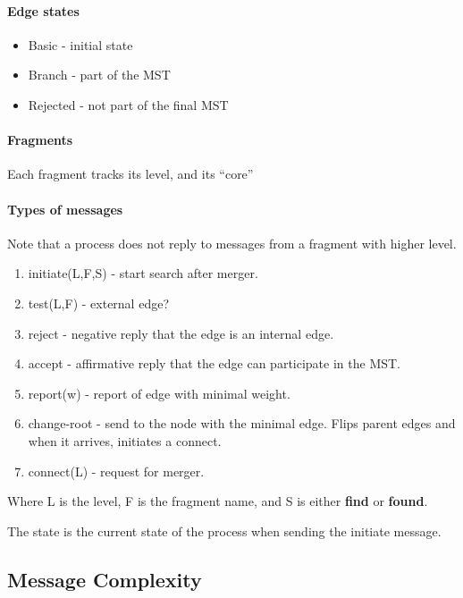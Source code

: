 \documentclass{idc_msc}
\begin{document}
\paragraph{Edge states}

\begin{itemize}
  \item Basic - initial state
  \item Branch - part of the MST
  \item Rejected - not part of the final MST
\end{itemize}

\paragraph{Fragments}

Each fragment tracks its level, and its ``core'' 

\paragraph{Types of messages}

Note that a process does not reply to messages from a fragment with higher level.

\begin{enumerate}
  \item initiate(L,F,S) - start search after merger.
  \item test(L,F) - external edge?
  \item reject - negative reply that the edge is an internal edge.
  \item accept - affirmative reply that the edge can participate in the MST.
  \item report(w) - report of edge with minimal weight.
  \item change-root - send to the node with the minimal edge. Flips parent edges and when it arrives, initiates a connect.
  \item connect(L) - request for merger.
\end{enumerate}

Where L is the level, F is the fragment name, and S is either \textbf{find} or \textbf{found}.

The state is the current state of the process when sending the initiate message.

\subsection{Message Complexity}
\end{document}

